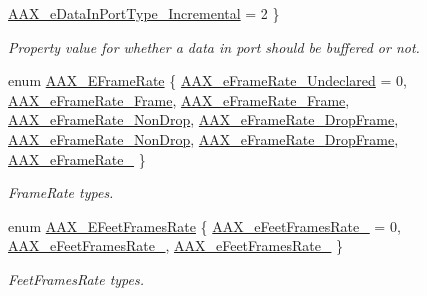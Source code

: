 \begin{DoxyCompactItemize}
\mbox{\hyperlink{a00491_ab5677b173ad8647c24d34d28272d11fca4c356b21e878cfafca33ff61e1044b2e}{A\+A\+X\+\_\+e\+Data\+In\+Port\+Type\+\_\+\+Incremental}} = 2
 \}
\begin{DoxyCompactList}\small\item\em Property value for whether a data in port should be buffered or not. \end{DoxyCompactList}\item 
enum \mbox{\hyperlink{a00491_a1271a51553bf508de59864334111aa8f}{A\+A\+X\+\_\+\+E\+Frame\+Rate}} \{ \newline
\mbox{\hyperlink{a00491_a1271a51553bf508de59864334111aa8fa2531bb96f482f75193a33847de41339d}{A\+A\+X\+\_\+e\+Frame\+Rate\+\_\+\+Undeclared}} = 0, 
\mbox{\hyperlink{a00491_a1271a51553bf508de59864334111aa8fae01baa9a691f9dfc1c1722f7e699a0b1}{A\+A\+X\+\_\+e\+Frame\+Rate\+\_\+Frame}}, 
\mbox{\hyperlink{a00491_a1271a51553bf508de59864334111aa8fad1a67aa0eed5e8311682660e76ee0ba0}{A\+A\+X\+\_\+e\+Frame\+Rate\+\_\+Frame}}, 
\mbox{\hyperlink{a00491_a1271a51553bf508de59864334111aa8fa85a4be2351bdb49f5ccf67518da0a9f4}{A\+A\+X\+\_\+e\+Frame\+Rate\+\_\+Non\+Drop}}, 
\newline
\mbox{\hyperlink{a00491_a1271a51553bf508de59864334111aa8fa84ab974603632508561b516eae6eb016}{A\+A\+X\+\_\+e\+Frame\+Rate\+\_\+Drop\+Frame}}, 
\mbox{\hyperlink{a00491_a1271a51553bf508de59864334111aa8fa829aad6d7a7766ff5ec8827107d13e52}{A\+A\+X\+\_\+e\+Frame\+Rate\+\_\+Non\+Drop}}, 
\mbox{\hyperlink{a00491_a1271a51553bf508de59864334111aa8facf8c9beac64946ca738a1a94c6e52151}{A\+A\+X\+\_\+e\+Frame\+Rate\+\_\+Drop\+Frame}}, 
\mbox{\hyperlink{a00491_a1271a51553bf508de59864334111aa8fac21050d46f45b891de39d1dc619cf58e}{A\+A\+X\+\_\+e\+Frame\+Rate\+\_}}
 \}
\begin{DoxyCompactList}\small\item\em Frame\+Rate types. \end{DoxyCompactList}\item 
enum \mbox{\hyperlink{a00491_a8a0c9dafef741a26ee8c06f7285a0dfa}{A\+A\+X\+\_\+\+E\+Feet\+Frames\+Rate}} \{ \mbox{\hyperlink{a00491_a8a0c9dafef741a26ee8c06f7285a0dfaa30fa0a62d08c15106c38d98fbb9c9b62}{A\+A\+X\+\_\+e\+Feet\+Frames\+Rate\+\_}} = 0, 
\mbox{\hyperlink{a00491_a8a0c9dafef741a26ee8c06f7285a0dfaaafabb0537ad8554a052f26f04e1ca0c5}{A\+A\+X\+\_\+e\+Feet\+Frames\+Rate\+\_}}, 
\mbox{\hyperlink{a00491_a8a0c9dafef741a26ee8c06f7285a0dfaa603154b5e8d45a9a940ba236a728f08e}{A\+A\+X\+\_\+e\+Feet\+Frames\+Rate\+\_}}
 \}
\begin{DoxyCompactList}\small\item\em Feet\+Frames\+Rate types. \end{DoxyCompactList}\item 

\end{DoxyCompactItemize}
